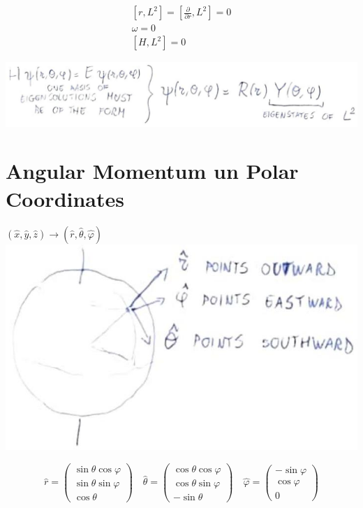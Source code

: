 \documentclass[10pt]{article}
\begin{document}
$$
\begin{gathered}
{\left[r, L^{2}\right]=\left[\frac{\partial}{\partial r}, L^{2}\right]=0} \\
\omega=0 \\
{\left[H, L^{2}\right]=0}
\end{gathered}
$$

\begin{center}
\includegraphics[max width=\textwidth]{2025_10_16_22329e0f50bdd2511b17g-06}
\end{center}

\section*{Angular Momentum un Polar Coordinates}
$(\hat{x}, \hat{y}, \hat{z}) \longrightarrow(\hat{r}, \hat{\theta}, \hat{\varphi})$\\
\includegraphics[max width=\textwidth, center]{2025_10_16_22329e0f50bdd2511b17g-07}

$$
\hat{r}=\left(\begin{array}{c}
\sin \theta \cos \varphi \\
\sin \theta \sin \varphi \\
\cos \theta
\end{array}\right) \quad \hat{\theta}=\left(\begin{array}{c}
\cos \theta \cos \varphi \\
\cos \theta \sin \varphi \\
-\sin \theta
\end{array}\right) \quad \hat{\varphi}=\left(\begin{array}{c}
-\sin \varphi \\
\cos \varphi \\
0
\end{array}\right)
$$
\end{document}
